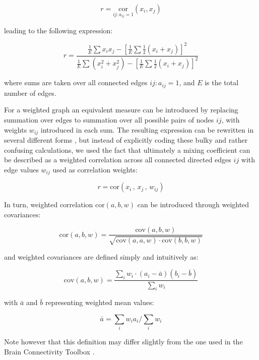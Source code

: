 \documentclass{article}
\begin{document}
\[ r=\underset{ij: a_{ij}=1}{\text{cor}}(x_i,x_j) \]

leading to the following expression:

\[ r = \frac{\frac{1}{E} \sum{x_i x_j} - [\frac{1}{E} \sum{\frac{1}{2}(x_i+x_j)}]^2} {\frac{1}{E} \sum{(x_i^2+x_j^2)}-[\frac{1}{E} \sum{\frac{1}{2}(x_i+x_j)}]^2} \]

where sums are taken over all connected edges $ij: a_{ij}=1$, and $E$ is the total number of edges.

For a weighted graph an equivalent measure can be introduced by replacing summation over edges to summation over all possible pairs of nodes $ij$, with weights $w_{ij}$ introduced in each sum. The resulting expression can be rewritten in several different forms \citep{newman2003mixing,leung2007weighted,farine2014weighted,teller2014assortative}, but instead of explicitly coding these bulky and rather confusing calculations, we used the fact that ultimately a mixing coefficient can be described as a weighted correlation across all connected directed edges $ij$ with edge values $w_{ij}$ used as correlation weights:

\[ r=\text{cor}(x_i \, , \, x_j \, , \, w_{ij}) \]

In turn, weighted correlation $\text{cor}(a,b,w)$ can be introduced through weighted covariances: 

\[ \text{cor}(a,b,w) = \frac{\text{cov}(a,b,w)}{\sqrt{\text{cov}(a,a,w) \cdot \text{cov}(b,b,w)}} \]

and weighted covariances are defined simply and intuitively as: 

\[ \text{cov}(a,b,w) = \frac{\sum_i{w_i \cdot (a_i-\bar{a})(b_i-\bar{b})}}{\sum_i{w_i}} \]

with $\bar{a}$ and $\bar{b}$ representing weighted mean values: 

\[ \bar{a}=\sum_i{w_i a_i}/\sum_i{w_i} \]

Note however that this definition may differ slightly from the one used in the Brain Connectivity Toolbox \citep{rubinov2010toolbox}.
\end{document}
